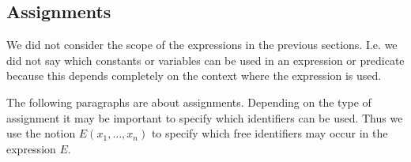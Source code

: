 \subsection{Assignments}
\label{assignments}

We did not consider the scope of the expressions in the previous sections.
I.e. we did not say which constants or variables can be used in an expression or predicate because
this depends completely on the context where the expression is used.

The following paragraphs are about assignments. Depending on the type of assignment it
may be important to specify which identifiers can be used.
Thus we use the notion $E(x_1,\ldots,x_n)$ to specify which free identifiers may occur
in the expression $E$.

\newcommand{\eventbassignmentexpr}[1]{E_{#1}(\allconstants,\concvariables,\concparameters)}


